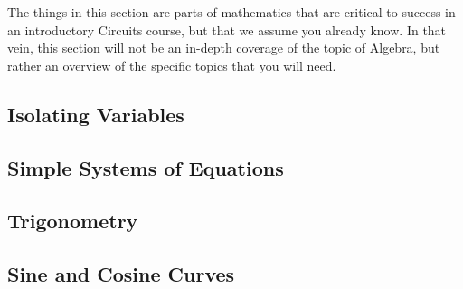 The things in this section are parts of mathematics that are critical to success in an introductory Circuits course, but that we assume you already know.  In that vein, this section will not be an in-depth coverage of the topic of Algebra, but rather an overview of the specific topics that you will need.
\subsection*{Isolating Variables}
\subsection*{Simple Systems of Equations}
\subsection*{Trigonometry}
\subsection*{Sine and Cosine Curves}
